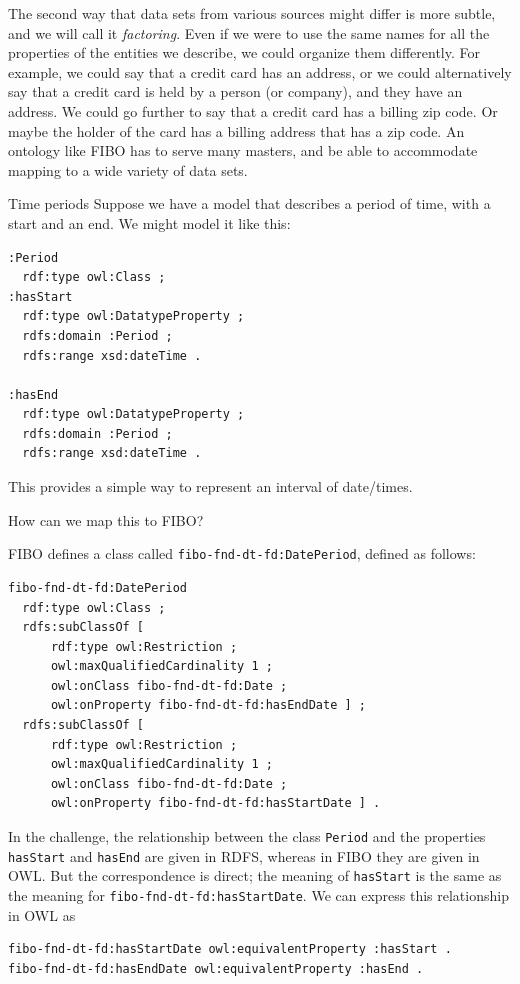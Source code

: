 The second way that data sets from various sources might differ is more subtle, and we will call it \emph{factoring}.  
Even if we were to use the same names for all
the properties of the entities we describe, we could organize them differently.  For example, we could say that a credit card has
an address, or we could alternatively say that a credit card is held by a person (or company), and they have an address.  We could go further 
to say that a credit card has a billing zip code.  Or maybe the holder of the card has a billing address that has a zip code. 
An ontology like FIBO has to serve many masters, and be able to accommodate mapping to a wide variety of data sets. 

\begin{challenge}{Time periods}
Suppose we have a model that describes a period of time, with a start and an end.  We might model it like this: 

\begin{lstlisting}
:Period
  rdf:type owl:Class ;
:hasStart
  rdf:type owl:DatatypeProperty ;
  rdfs:domain :Period ;
  rdfs:range xsd:dateTime .
 
:hasEnd
  rdf:type owl:DatatypeProperty ;
  rdfs:domain :Period ;
  rdfs:range xsd:dateTime .
\end{lstlisting}

This provides a simple way to represent an interval of date/times. 

How can we map this to FIBO? 

\solution

FIBO defines a class called \texttt{fibo-fnd-dt-fd:DatePeriod}, defined as follows:

\begin{lstlisting}
fibo-fnd-dt-fd:DatePeriod
  rdf:type owl:Class ;
  rdfs:subClassOf [
      rdf:type owl:Restriction ;
      owl:maxQualifiedCardinality 1 ;
      owl:onClass fibo-fnd-dt-fd:Date ;
      owl:onProperty fibo-fnd-dt-fd:hasEndDate ] ;
  rdfs:subClassOf [
      rdf:type owl:Restriction ;
      owl:maxQualifiedCardinality 1 ;
      owl:onClass fibo-fnd-dt-fd:Date ;
      owl:onProperty fibo-fnd-dt-fd:hasStartDate ] .
\end{lstlisting}

In the challenge, the relationship between the class \texttt{Period} and the properties \texttt{hasStart} and \texttt{hasEnd} are 
given in RDFS, whereas in FIBO they are given in OWL.  But the correspondence is direct; the meaning of \texttt{hasStart} is the same as 
the meaning for \texttt{fibo-fnd-dt-fd:hasStartDate}.  We can express this relationship in OWL as 

\begin{lstlisting}
fibo-fnd-dt-fd:hasStartDate owl:equivalentProperty :hasStart .
fibo-fnd-dt-fd:hasEndDate owl:equivalentProperty :hasEnd .
\end{lstlisting}
\end{challenge}


